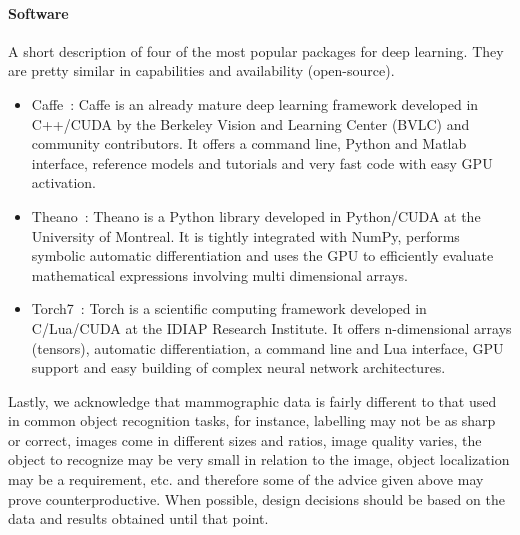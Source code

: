 \paragraph{Software}A short description of four of the most popular packages for deep learning. They are pretty similar in capabilities and availability (open-source).

\begin{itemize}
	\item Caffe~\cite{Jia2014}: Caffe is an already mature deep learning framework developed in C++/CUDA by the Berkeley Vision and Learning Center (BVLC) and community contributors. It offers a command line, Python and Matlab interface, reference models and tutorials and very fast code with easy GPU activation.
	\item Theano~\cite{Bergstra2010, Bastien2012}: Theano is a Python library developed in Python/CUDA at the University of Montreal. It is tightly integrated with NumPy, performs symbolic automatic differentiation and uses the GPU to efficiently evaluate mathematical expressions involving multi dimensional arrays.
	\item Torch7~\cite{Collobert2011}: Torch is a scientific computing framework developed in C/Lua/CUDA at the IDIAP Research Institute. It offers n-dimensional arrays (tensors), automatic differentiation, a command line and Lua interface, GPU support and easy building of complex neural network architectures.
\end{itemize}

\bigskip

Lastly, we acknowledge that mammographic data is fairly different to that used in common object recognition tasks, for instance, labelling may not be as sharp or correct, images come in different sizes and ratios, image quality varies, the object to recognize may be very small in relation to the image, object localization may be a requirement, etc. and therefore some of the advice given above may prove counterproductive. When possible, design decisions should be based on the data and results obtained until that point.
